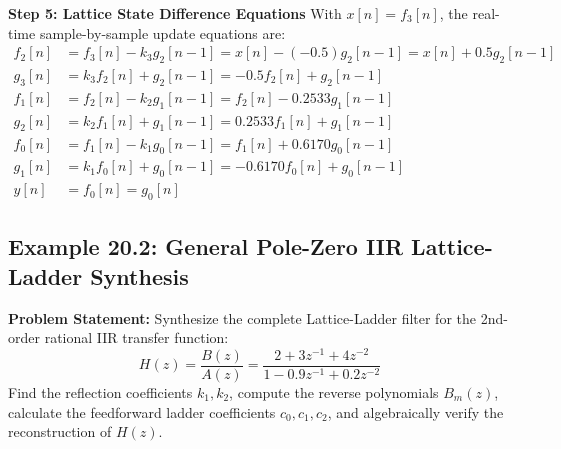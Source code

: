 \documentclass[11pt,a4paper]{article}
\begin{document}
\vspace{1mm}
\noindent\textbf{Step 5: Lattice State Difference Equations}
With $x[n] = f_3[n]$, the real-time sample-by-sample update equations are:
\begin{align}
f_2[n] &= f_3[n] - k_3 g_2[n-1] = x[n] - (-0.5) g_2[n-1] = x[n] + 0.5 g_2[n-1] \\
g_3[n] &= k_3 f_2[n] + g_2[n-1] = -0.5 f_2[n] + g_2[n-1] \\
f_1[n] &= f_2[n] - k_2 g_1[n-1] = f_2[n] - 0.2533 g_1[n-1] \\
g_2[n] &= k_2 f_1[n] + g_1[n-1] = 0.2533 f_1[n] + g_1[n-1] \\
f_0[n] &= f_1[n] - k_1 g_0[n-1] = f_1[n] + 0.6170 g_0[n-1] \\
g_1[n] &= k_1 f_0[n] + g_0[n-1] = -0.6170 f_0[n] + g_0[n-1] \\
y[n] &= f_0[n] = g_0[n]
\end{align}

\subsection{Example 20.2: General Pole-Zero IIR Lattice-Ladder Synthesis}
\textbf{Problem Statement:} Synthesize the complete Lattice-Ladder filter for the 2nd-order rational IIR transfer function:
\begin{equation}
H(z) = \frac{B(z)}{A(z)} = \frac{2 + 3 z^{-1} + 4 z^{-2}}{1 - 0.9 z^{-1} + 0.2 z^{-2}}
\end{equation}
Find the reflection coefficients $k_1, k_2$, compute the reverse polynomials $B_m(z)$, calculate the feedforward ladder coefficients $c_0, c_1, c_2$, and algebraically verify the reconstruction of $H(z)$.
\end{document}
